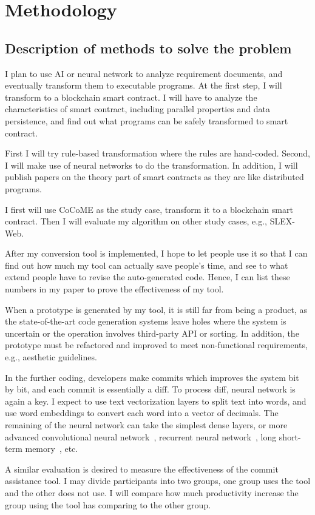 \chapter{Methodology}


\section{Description of methods to solve the problem}

I plan to use AI or neural network to analyze requirement documents, and eventually transform them to executable programs.
At the first step, I will transform to a blockchain smart contract.
I will have to analyze the characteristics of smart contract, including parallel properties and data persistence, and find out what programs can be safely transformed to smart contract.

First I will try rule-based transformation where the rules are hand-coded. Second, I will make use of neural networks to do the transformation. In addition, I will publish papers on the theory part of smart contracts as they are like distributed programs.

I first will use CoCoME as the study case, transform it to a blockchain smart contract. Then I will evaluate my algorithm on other study cases, e.g., SLEX-Web.

After my conversion tool is implemented, I hope to let people use it so that I can find out how much my tool can actually save people's time, and see to what extend people have to revise the auto-generated code. Hence, I can list these numbers in my paper to prove the effectiveness of my tool.

When a prototype is generated by my tool, it is still far from being a product, as the state-of-the-art code generation systems leave holes where the system is uncertain or the operation involves  third-party API or sorting. In addition, the prototype must be refactored and improved to meet non-functional requirements, e.g., aesthetic guidelines.

In the further coding, developers make commits which improves the system bit by bit, and each commit is essentially a diff. To process diff, neural network is again a key. I expect to use text vectorization layers to split text into words, and use word embeddings to convert each word into a vector of decimals.
The remaining of the neural network can take the simplest dense layers, or more advanced convolutional neural network~\cite{albawi2017understanding}, recurrent neural network~\cite{tarwani2017survey}, long short-term memory~\cite{skovajsova2017long}, etc.

A similar evaluation is desired to measure the effectiveness of the commit assistance tool. I may divide participants into two groups, one group uses the tool and the other does not use. I will compare how much productivity increase the group using the tool has comparing to the other group.



